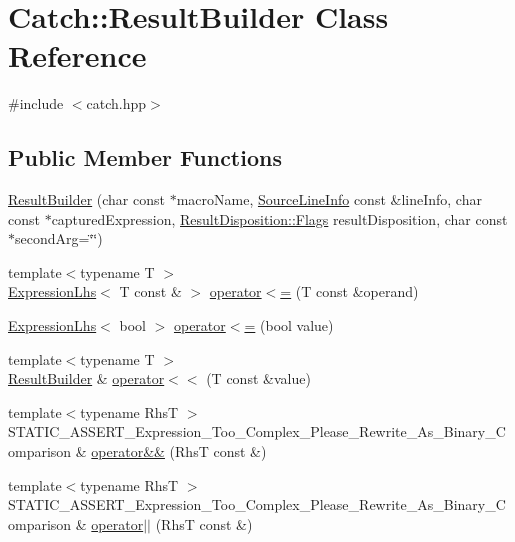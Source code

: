 \hypertarget{class_catch_1_1_result_builder}{}\section{Catch\+:\+:Result\+Builder Class Reference}
\label{class_catch_1_1_result_builder}


{\ttfamily \#include $<$catch.\+hpp$>$}

\subsection*{Public Member Functions}
\begin{DoxyCompactItemize}
\item 
\hyperlink{class_catch_1_1_result_builder_a8579c3056f64f9324cf1181532828376}{Result\+Builder} (char const $\ast$macro\+Name, \hyperlink{struct_catch_1_1_source_line_info}{Source\+Line\+Info} const \&line\+Info, char const $\ast$captured\+Expression, \hyperlink{struct_catch_1_1_result_disposition_a3396cad6e2259af326b3aae93e23e9d8}{Result\+Disposition\+::\+Flags} result\+Disposition, char const $\ast$second\+Arg=\char`\"{}\char`\"{})
\item 
{\footnotesize template$<$typename T $>$ }\\\hyperlink{class_catch_1_1_expression_lhs}{Expression\+Lhs}$<$ T const  \& $>$ \hyperlink{class_catch_1_1_result_builder_ad76939f5a52fcb534f97b49a0b7bc560}{operator$<$=} (T const \&operand)
\item 
\hyperlink{class_catch_1_1_expression_lhs}{Expression\+Lhs}$<$ bool $>$ \hyperlink{class_catch_1_1_result_builder_a3b87b20bcd1ef9e630880e59eeefba2a}{operator$<$=} (bool value)
\item 
{\footnotesize template$<$typename T $>$ }\\\hyperlink{class_catch_1_1_result_builder}{Result\+Builder} \& \hyperlink{class_catch_1_1_result_builder_a5aa79ce6160ab8cd800eb65bbd7a28a4}{operator$<$$<$} (T const \&value)
\item 
{\footnotesize template$<$typename RhsT $>$ }\\S\+T\+A\+T\+I\+C\+\_\+\+A\+S\+S\+E\+R\+T\+\_\+\+Expression\+\_\+\+Too\+\_\+\+Complex\+\_\+\+Please\+\_\+\+Rewrite\+\_\+\+As\+\_\+\+Binary\+\_\+\+Comparison \& \hyperlink{class_catch_1_1_result_builder_ae92c6badf3f8e2ad4df66701a285f996}{operator\&\&} (RhsT const \&)
\item 
{\footnotesize template$<$typename RhsT $>$ }\\S\+T\+A\+T\+I\+C\+\_\+\+A\+S\+S\+E\+R\+T\+\_\+\+Expression\+\_\+\+Too\+\_\+\+Complex\+\_\+\+Please\+\_\+\+Rewrite\+\_\+\+As\+\_\+\+Binary\+\_\+\+Comparison \& \hyperlink{class_catch_1_1_result_builder_ad489243e89e9f0ec3cb1f95392a537de}{operator$\vert$$\vert$} (RhsT const \&)

\end{DoxyCompactItemize}
